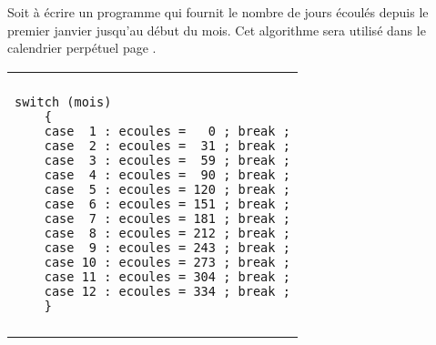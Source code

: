      Soit \`a \'ecrire un programme qui fournit le nombre de jours
	 \'ecoul\'es depuis le
	 premier janvier jusqu'au d\'ebut du mois.
	 Cet algorithme sera utilis\'e dans
	 le calendrier perp\'etuel page \pageref{Perpetuel}. 



\begin{center}
\begin{tabular}{|l|}
\hline
\multicolumn{1}{|c|}{}\\
\begin{minipage}[t]{7cm}
\begin{verbatim}  
switch (mois)
    {
    case  1 : ecoules =   0 ; break ;
    case  2 : ecoules =  31 ; break ;
    case  3 : ecoules =  59 ; break ;
    case  4 : ecoules =  90 ; break ;
    case  5 : ecoules = 120 ; break ;
    case  6 : ecoules = 151 ; break ;
    case  7 : ecoules = 181 ; break ;
    case  8 : ecoules = 212 ; break ;
    case  9 : ecoules = 243 ; break ;
    case 10 : ecoules = 273 ; break ;
    case 11 : ecoules = 304 ; break ;
    case 12 : ecoules = 334 ; break ;
    }
\end{verbatim} 
\end{minipage} \\
\multicolumn{1}{|c|}{}\\
\hline
\end{tabular} \end{center}
